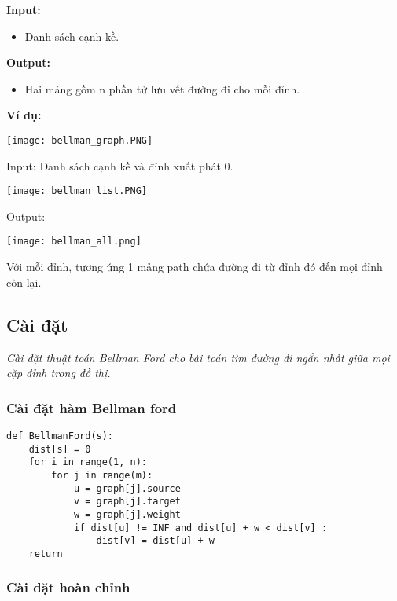 \documentclass[a4paper]{article}
\begin{document}
\textbf{Input:}
\begin{itemize}
    \item Danh sách cạnh kề.
\end{itemize}

\textbf{Output:}
\begin{itemize}
    \item Hai mảng gồm n phần tử lưu vết đường đi cho mỗi đỉnh.
\end{itemize}

\textbf{Ví dụ:}
\begin{center}
    \texttt{[image: bellman\_graph.PNG]}
\end{center}
Input: Danh sách cạnh kề và đỉnh xuất phát 0.
\begin{center}
    \texttt{[image: bellman\_list.PNG]}
\end{center}
Output:
\begin{center}
    \texttt{[image: bellman\_all.png]}
\end{center}
Với mỗi đỉnh, tương ứng 1 mảng path chứa đường đi từ đỉnh đó đến mọi đỉnh còn lại.
\subsection{Cài đặt}

\itshape{Cài đặt thuật toán Bellman Ford cho bài toán tìm đường đi ngắn nhất giữa mọi cặp đỉnh trong đồ thị.}

\subsubsection{Cài đặt hàm Bellman ford}

\begin{mdframed}[hidealllines=true,backgroundcolor=magenta!10]
		\begin{lstlisting}
def BellmanFord(s):
    dist[s] = 0
    for i in range(1, n):
        for j in range(m):
            u = graph[j].source
            v = graph[j].target
            w = graph[j].weight
            if dist[u] != INF and dist[u] + w < dist[v] :
                dist[v] = dist[u] + w
    return 
		\end{lstlisting}
	\end{mdframed}
\subsubsection{Cài đặt hoàn chỉnh}
\end{document}
